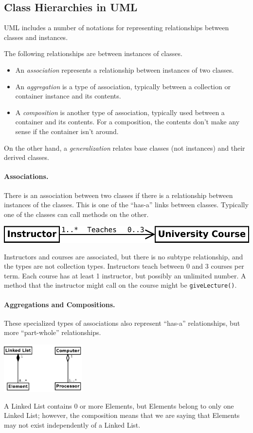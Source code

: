 \subsection*{Class Hierarchies in UML}
UML includes a number of notations for representing relationships
between classes and instances.

The following relationships are between instances of classes.
\begin{itemize}
\item An \emph{association} represents a relationship between instances
of two classes.
\item An \emph{aggregation} is a type of association, typically between a
collection or container instance and its contents.
\item A \emph{composition} is another type of association, typically
used between a container and its contents. For a composition, the contents
don't make any sense if the container isn't around.
\end{itemize}

On the other hand, a \emph{generalization} relates base classes (not
instances) and their derived classes.

\paragraph{Associations.} There is an association between two classes
if there is a relationship between instances of the classes. This is
one of the ``has-a'' links between classes.  Typically one of the
classes can call methods on the other.
\begin{center}
\includegraphics[width=.5\textwidth]{images/association.pdf}
\end{center}
Instructors and courses are associated, but there is no subtype
relationship, and the types are not collection types. Instructors
teach between 0 and 3 courses per term. Each course has at least 1
instructor, but possibly an unlimited number. A method that the
instructor might call on the course might be {\tt giveLecture()}.

\paragraph{Aggregations and Compositions.} These specialized
types of associations also represent ``has-a'' relationships, but
more ``part-whole'' relationships.
\begin{center}
\includegraphics[height=7em]{images/aggr-comp.pdf}
\end{center}
A Linked List contains 0 or more Elements, but Elements belong to only
one Linked List; however, the composition means that we are
saying that Elements may not exist independently of a Linked List.

